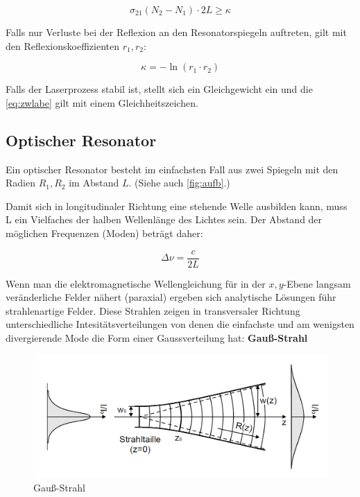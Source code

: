 \documentclass[slug=GL, room=HZDR\ Dresden/Rossendorf\,\ Geb.\ 620/123, supervisor=Martin\ Rehwald;\, Tim\ Ziegler]{../../Lab_Report_LaTeX/lab_report}
\begin{document}
\begin{equation}
  \label{eq:zwlabe}
  \tag{zweite Laserbedingung}
  \sigma_{21}(N_2-N_1)\cdot 2L \geq \kappa
\end{equation}

Falls nur Verluste bei der Reflexion an den Resonatorspiegeln
auftreten, gilt mit den Reflexionskoeffizienten \(r_1,r_2\):

\begin{equation}
  \label{eq:kappa}
  \kappa = - \ln(r_1\cdot r_2)
\end{equation}

Falls der Laserprozess stabil ist, stellt sich ein Gleichgewicht ein
und die \ref{eq:zwlabe} gilt mit einem Gleichheitszeichen.

\subsection{Optischer Resonator}
\label{sec:reso}

Ein optischer Resonator besteht im einfachsten Fall aus zwei Spiegeln
mit den Radien \(R_1,R_2\) im Abstand \(L\). (Siehe auch
\ref{fig:aufb}.)

Damit sich in longitudinaler Richtung eine stehende Welle ausbilden
kann, muss L ein Vielfaches der halben Wellenl\"ange des Lichtes sein.
Der Abstand der m\"oglichen Frequenzen (Moden) betr\"agt daher:

\begin{equation}
  \label{eq:longmodes}
  \Delta\nu = \frac{c}{2L}
\end{equation}

Wenn man die elektromagnetische Wellengleichung f\"ur in der
\(x,y\)-Ebene langsam ver\"anderliche Felder n\"ahert (paraxial)
ergeben sich analytische L\"osungen f\"uhr strahlenartige Felder.
Diese Strahlen zeigen in transversaler Richtung unterschiedliche
Intesit\"atsverteilungen von denen die einfachste und am wenigsten
divergierende Mode die Form einer Gaussverteilung hat:
\textbf{Gau\ss{}-Strahl}

\begin{figure}[H]\centering
  \includegraphics[width=.5\columnwidth]{gauss-strahl.png}
  \caption[Gauss]{Gau\ss{}-Strahl }
  \label{fig:gauss}
\end{figure}
\end{document}
